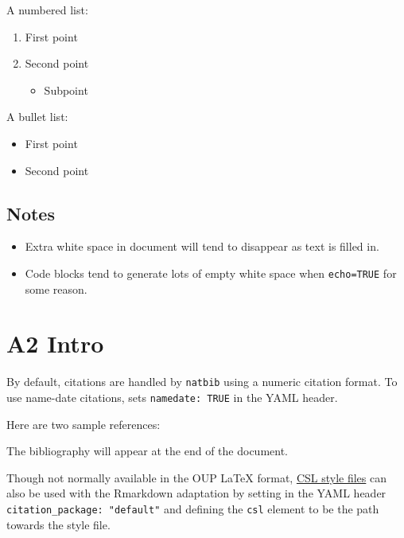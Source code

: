 \documentclass[webpdf,large,contemporary,namedate]{oup-authoring-template}
\providecommand{\tightlist}{%
  \setlength{\itemsep}{0pt}\setlength{\parskip}{0pt}}
\theoremstyle{thmstyleone}
\theoremstyle{thmstyletwo}
\theoremstyle{thmstylethree}
\begin{document}
A numbered list:

\begin{enumerate}
\def\labelenumi{\arabic{enumi})}
\tightlist
\item
  First point
\item
  Second point

  \begin{itemize}
  \tightlist
  \item
    Subpoint
  \end{itemize}
\end{enumerate}

A bullet list:

\begin{itemize}
\tightlist
\item
  First point
\item
  Second point
\end{itemize}

\hypertarget{notes}{%
\subsection{Notes}\label{notes}}

\begin{itemize}
\tightlist
\item
  Extra white space in document will tend to disappear as text is filled
  in.
\item
  Code blocks tend to generate lots of empty white space when
  \texttt{echo=TRUE} for some reason.
\end{itemize}

\hypertarget{a2-intro}{%
\section{A2 Intro}\label{a2-intro}}

By default, citations are handled by \texttt{natbib} using a numeric
citation format. To use name-date citations, sets
\texttt{namedate:\ TRUE} in the YAML header.

Here are two sample references:

The bibliography will appear at the end of the document.

Though not normally available in the OUP LaTeX format,
\href{https://www.zotero.org/styles}{CSL style files} can also be used
with the Rmarkdown adaptation by setting in the YAML header
\texttt{citation\_package:\ "default"} and defining the \texttt{csl}
element to be the path towards the style file.
\end{document}
